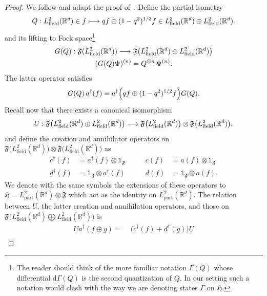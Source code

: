 \documentclass[10pt]{amsart}
\theoremstyle{definition}\newtheorem{defi}[theo]{Definition}\newtheorem{rema}[theo]{Remark}\newtheorem{exam}[theo]{Example}\newtheorem{exem}[theo]{Example}\newtheorem{nota}[theo]{Notation}
\DeclareMathOperator{\partt}{part}
\DeclareMathOperator{\field}{field}
\newcommand{\rmd}{\mathrm{d}}
\newcommand{\R}{\mathbb{R}}
\newcommand{\gH}{\mathfrak{H}}
\newcommand{\gF}{\mathfrak{F}}
\newcommand{\1}{\mathds{1}}
\let\oldin\in
\renewcommand{\in}{\mathchoice{\oldin}{\oldin}{\,\oldin\,}{\,\oldin\,}}
\renewcommand*{\to}{\mathchoice{\longrightarrow}{\rightarrow}{\rightarrow}{\rightarrow}}
\let\oldmapsto\mapsto
\renewcommand*{\mapsto}{\mathchoice{\longmapsto}{\oldmapsto}{\oldmapsto}{\oldmapsto}}
\let\originalleft\left
\let\originalright\right
\renewcommand{\left}{\mathopen{}\mathclose\bgroup\originalleft}
\renewcommand{\right}{\aftergroup\egroup\originalright}
\begin{document}
\begin{proof}
We follow and adapt the proof of~\cite[Section~A.1.2]{HaiLewSol-09b}. Define the partial isometry
\begin{equation}
Q: L^2_{\field}(\R^d) \in f \mapsto q f \oplus(1-q^2)^{1/2} f \in L^2_{\field}(\R^d) \oplus L^2_{\field}(\R^d).
\end{equation}
and its lifting to Fock space\footnote{The reader should think of the more familiar notation $\Gamma(Q)$ whose differential $\rmd\Gamma (Q)$ is the second quantization of $Q$. In our setting such a notation would clash with the way we are denoting states $\Gamma$ on $ \gH$.}
\begin{equation}
\begin{gathered}
G(Q):\gF(L^2_{\field}(\R^d)) \to \gF\big(L^2_{\field}(\R^d)\oplus L^2_{\field}(\R^d)\big)\\
(G(Q)\Psi)^{(n)}=Q^{\otimes n} \,\Psi^{(n)}.
\end{gathered}
\end{equation}
The latter operator satisfies
\begin{equation}
G(Q) \,a^\dagger(f)=a^\dagger\left(qf\oplus (1-q^2)^{1/2}f\right) G(Q).
\end{equation}
Recall now that there exists a canonical isomorphism
\begin{equation}
U:\gF \big(L^2_{\field}(\R^d)\oplus L^2_{\field}(\R^d)\big) \to \gF\big(L^2_{\field}(\R^d)\big) \otimes \gF\big(L^2_{\field}(\R^d)\big),
\end{equation}
and define the creation and annihilator operators on $
\gF\big(L^2_{\field}(\R^d)\big) \otimes
\gF\big(L^2_{\field}(\R^d)\big)$ as
\begin{equation}
\begin{aligned}
c^\dagger(f)&= a^\dagger(f)\otimes \1_{\gF}\qquad &c(f) &=a(f)\otimes \1_{\gF}\\
d^\dagger(f) &= \1_{\gF}\otimes a^\dagger(f)\qquad &d(f) &=\1_{\gF}\otimes a(f).
\end{aligned}
\end{equation}
We denote with the same symbols the extensions of these operators to $ \gH=L^2_{\partt}(\R^d)\otimes \gF$ which act as the identity on $L^2_{\partt}(\R^d)$. The relation between $U$, the latter creation and annihilation operators, and those on $\gF\big(L^2_{\field}(\R^d)\bigoplus L^2_{\field}(\R^d)\big)$ is
\begin{equation}
\begin{split}
Ua^\dagger(f\oplus g)=\;&\big(c^\dagger(f)+d^\dagger(g)\big)U\\

\end{split}
\end{equation}
\end{proof}
\end{document}
